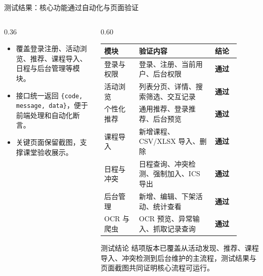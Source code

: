 \documentclass[UTF8,aspectratio=169]{ctexbeamer}
\newcommand{\good}[1]{\textcolor{GoodGreen}{\textbf{#1}}}
\begin{document}
\begin{frame}{测试结果：核心功能通过自动化与页面验证}
    \begin{columns}[T,onlytextwidth]
        \begin{column}{0.36\textwidth}
            \begin{itemize}
                \item 覆盖登录注册、活动浏览、推荐、课程导入、日程与后台管理等模块。
                \item 接口统一返回 \texttt{\{code, message, data\}}，便于前端处理和自动化断言。
                \item 关键页面保留截图，支撑课堂验收展示。
            \end{itemize}
        \end{column}
        \begin{column}{0.60\textwidth}
            \scriptsize
            \renewcommand{\arraystretch}{1.08}
            \begin{tabular}{p{0.22\linewidth}p{0.48\linewidth}p{0.16\linewidth}}
                \toprule
                \textbf{模块} & \textbf{验证内容} & \textbf{结论} \\
                \midrule
                登录与权限 & 登录、注册、当前用户、后台权限 & \good{通过} \\
                活动浏览 & 列表分页、详情、搜索筛选、交互记录 & \good{通过} \\
                个性化推荐 & 通用推荐、登录推荐、后台预览 & \good{通过} \\
                课程导入 & 新增课程、CSV/XLSX 导入、删除 & \good{通过} \\
                日程与冲突 & 日程查询、冲突检测、强制加入、ICS 导出 & \good{通过} \\
                后台管理 & 新增、编辑、下架活动、统计查看 & \good{通过} \\
                OCR 与爬虫 & OCR 预览、异常输入、抓取记录查询 & \good{通过} \\
                \bottomrule
            \end{tabular}
            \vspace{0.25em}
            \begin{block}{测试结论}
                \scriptsize
                结项版本已覆盖从活动发现、推荐、课程导入、冲突检测到后台维护的主流程，测试结果与页面截图共同证明核心流程可运行。
            \end{block}
        \end{column}
    \end{columns}
\end{frame}
\end{document}
